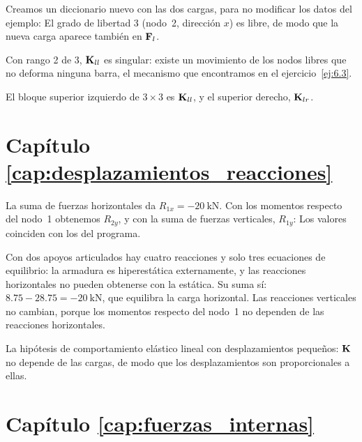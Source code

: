 Creamos un diccionario nuevo con las dos cargas, para no modificar los datos
del ejemplo:
El grado de libertad 3 (nodo~2, dirección $x$) es libre, de modo que la
nueva carga aparece también en $\mathbf{F}_l$.

Con rango 2 de 3, $\mathbf{K}_{ll}$ es singular: existe un movimiento de los nodos
libres que no deforma ninguna barra, el mecanismo que encontramos en el
ejercicio~\ref{ej:6.3}.

El bloque superior izquierdo de $3\times3$ es $\mathbf{K}_{ll}$, y el superior
derecho, $\mathbf{K}_{lr}$.

\section*{Capítulo \ref{cap:desplazamientos_reacciones}}

La suma de fuerzas horizontales da $R_{1x} = \SI{-20}{\kilo\newton}$. Con los
momentos respecto del nodo~1 obtenemos $R_{2y}$, y con la suma de fuerzas
verticales, $R_{1y}$:
Los valores coinciden con los del programa.

Con dos apoyos articulados hay cuatro reacciones y solo tres ecuaciones de
equilibrio: la armadura es hiperestática externamente, y las reacciones
horizontales no pueden obtenerse con la estática. Su suma sí:
$8.75 - 28.75 = \SI{-20}{\kilo\newton}$, que equilibra la carga horizontal.
Las reacciones verticales no cambian, porque los momentos respecto del nodo~1
no dependen de las reacciones horizontales.

La hipótesis de comportamiento elástico lineal con desplazamientos pequeños:
$\mathbf{K}$ no depende de las cargas, de modo que los desplazamientos son
proporcionales a ellas.


\section*{Capítulo \ref{cap:fuerzas_internas}}

